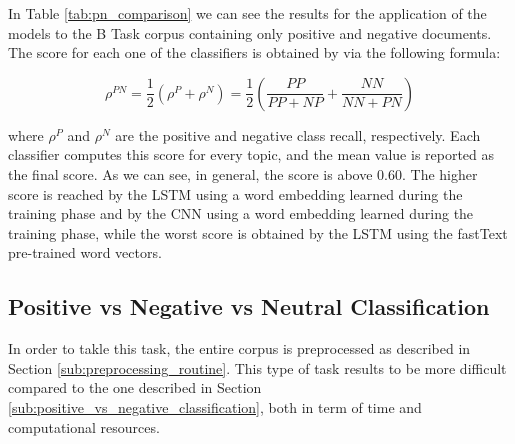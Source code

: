 \documentclass[11pt,twocolumn]{article}
\begin{document}
            \noindent
            In Table \ref{tab:pn_comparison} we can see the results for the application
            of the models to the B Task corpus containing only positive and negative documents. The score for
            each one of the classifiers is obtained by via the following formula:

            \begin{equation*}
                \rho^{PN} =\frac{1}{2}(\rho^{P} + \rho^{N}) = \frac{1}{2}
                \left ( \frac{PP}{PP + NP} + \frac{NN}{NN + PN} \right )
            \end{equation*}

            \noindent
            where $\rho^{P}$ and $\rho^{N}$ are the positive and negative class recall, respectively. Each
            classifier computes this score for every topic, and the mean value is reported as the final score.
            As we can  see, in general, the score is above $0.60$. The higher score is
            reached by the LSTM using a word embedding learned during the training phase and by the CNN using a
            word embedding learned during the training phase, while the worst score is obtained by the LSTM using
            the fastText pre-trained word vectors.

        \subsection{Positive vs Negative vs Neutral Classification} %
        \label{sub:positive_vs_negative_vs_neutral_classification}
            In order to takle this task, the entire corpus is preprocessed as described in Section
            \ref{sub:preprocessing_routine}. This type of task results to be more difficult compared to
            the one described in Section \ref{sub:positive_vs_negative_classification}, both in term of
            time and computational resources.
\end{document}
